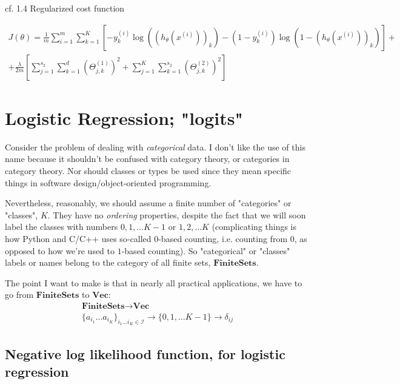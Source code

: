 \documentclass[10pt]{amsart}
\begin{document}
\begin{multicols*}{2}


cf. 1.4 Regularized cost function

\[
\begin{gathered}
  J(\theta) = \frac{1}{m} \sum_{i=1}^m \sum_{k=1}^K \left[ -y_k^{(i)} \log{ ((h_{\theta}(x^{(i)} ) )_k ) } - (1-y_k^{(i)} ) \log{ (1- (h_{\theta}(x^{(i)} ) )_k ) } \right] + \\
+ \frac{\lambda}{2m} \left[ \sum_{j=1}^{s_2} \sum_{ k=1}^{ d} (\Theta_{j,k}^{(1)} )^2 + \sum_{j=1}^{K} \sum_{k=1}^{s_2} (\Theta^{(2)}_{j,k} )^2 \right]
  \end{gathered}
\]

\section{Logistic Regression; "logits"}  

Consider the problem of dealing with \emph{categorical} data.  I don't like the use of this name because it shouldn't be confused with category theory, or categories in category theory.  Nor should classes or types be used since they mean specific things in software design/object-oriented programming.  

Nevertheless, reasonably, we should assume a finite number of "categories" or "classes", $K$.  They have no \emph{ordering} properties, despite the fact that we will soon label the classes with numbers $0,1,\dots K-1$ or $1,2,\dots K$ (complicating things is how Python and C/C++ uses so-called $0$-based counting, i.e. counting from $0$, as opposed to how we're used to $1$-based counting).  So "categorical" or "classes" labels or names belong to the category of all finite sets, $\textbf{FiniteSets}$.  

The point I want to make is that in nearly all practical applications, we have to go from $\textbf{FiniteSets}$ to $\textbf{Vec}$: 
\begin{equation}
\begin{gathered}
\textbf{FiniteSets} \to \textbf{Vec}   \\
	\lbrace a_{i_1} \dots a_{i_K} \rbrace_{i_1\dots i_K \in \mathcal{I} } \to \lbrace 0,1,\dots K-1 \rbrace \to \delta_{ij}
\end{gathered}
\end{equation}

\subsection{Negative log likelihood function, for logistic regression}


\end{multicols*}
\end{document}
